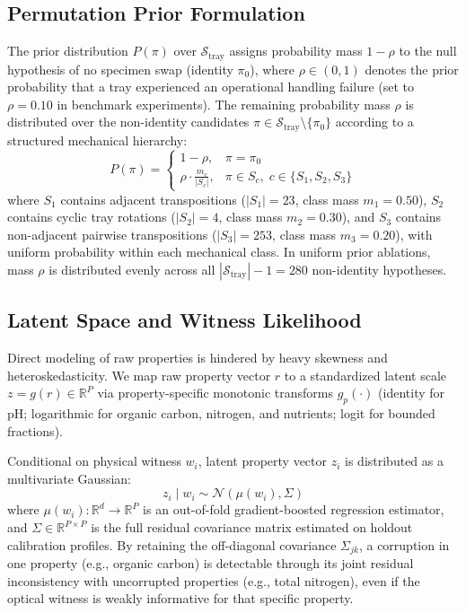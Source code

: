 \documentclass[journal,twoside]{IEEEtran}
\begin{document}
\subsection{Permutation Prior Formulation}
The prior distribution $P(\pi)$ over $\mathcal{S}_{\text{tray}}$ assigns probability mass $1 - \rho$ to the null hypothesis of no specimen swap (identity $\pi_0$), where $\rho \in (0, 1)$ denotes the prior probability that a tray experienced an operational handling failure (set to $\rho = 0.10$ in benchmark experiments). The remaining probability mass $\rho$ is distributed over the non-identity candidates $\pi \in \mathcal{S}_{\text{tray}} \setminus \{\pi_0\}$ according to a structured mechanical hierarchy:
\begin{equation}
P(\pi) = \begin{cases}
1 - \rho, & \pi = \pi_0 \\
\rho \cdot \frac{m_c}{|S_c|}, & \pi \in S_c, \; c \in \{S_1, S_2, S_3\}
\end{cases}
\label{eq:permutation_prior}
\end{equation}
where $S_1$ contains adjacent transpositions ($|S_1| = 23$, class mass $m_1 = 0.50$), $S_2$ contains cyclic tray rotations ($|S_2| = 4$, class mass $m_2 = 0.30$), and $S_3$ contains non-adjacent pairwise transpositions ($|S_3| = 253$, class mass $m_3 = 0.20$), with uniform probability within each mechanical class. In uniform prior ablations, mass $\rho$ is distributed evenly across all $|\mathcal{S}_{\text{tray}}| - 1 = 280$ non-identity hypotheses.

\subsection{Latent Space and Witness Likelihood}
Direct modeling of raw properties is hindered by heavy skewness and heteroskedasticity. We map raw property vector $r$ to a standardized latent scale $z = g(r) \in \mathbb{R}^P$ via property-specific monotonic transforms $g_p(\cdot)$ (identity for pH; logarithmic for organic carbon, nitrogen, and nutrients; logit for bounded fractions). 

Conditional on physical witness $w_i$, latent property vector $z_i$ is distributed as a multivariate Gaussian:
\begin{equation}
z_i \mid w_i \sim \mathcal{N}\left(\mu(w_i), \Sigma\right)
\label{eq:latent_gaussian}
\end{equation}
where $\mu(w_i): \mathbb{R}^d \to \mathbb{R}^P$ is an out-of-fold gradient-boosted regression estimator, and $\Sigma \in \mathbb{R}^{P \times P}$ is the full residual covariance matrix estimated on holdout calibration profiles. By retaining the off-diagonal covariance $\Sigma_{jk}$, a corruption in one property (e.g., organic carbon) is detectable through its joint residual inconsistency with uncorrupted properties (e.g., total nitrogen), even if the optical witness is weakly informative for that specific property.
\end{document}

